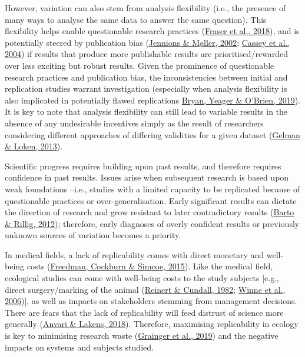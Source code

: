\documentclass[10pt,a4paper]{article}
\begin{document}
However, variation can also stem from analysis flexibility (i.e., the presence of many ways to analyse the same data to answer the same question).
This flexibility helps enable questionable research practices (\protect\hyperlink{ref-fraser_questionable_2018}{Fraser et al., 2018}), and is potentially steered by publication bias (\protect\hyperlink{ref-jennions_publication_2002}{Jennions \& Møller, 2002}; \protect\hyperlink{ref-cassey_survey_2004}{Cassey et al., 2004}) if results that produce more publishable results are prioritised/rewarded over less exciting but robust results.
Given the prominence of questionable research practices and publication bias, the inconsistencies between initial and replication studies warrant investigation (especially when analysis flexibility is also implicated in potentially flawed replications \protect\hyperlink{ref-bryan_replicator_2019}{Bryan, Yeager \& O'Brien, 2019}).
It is key to note that analysis flexibility can still lead to variable results in the absence of any undesirable incentives simply as the result of researchers considering different approaches of differing validities for a given dataset (\protect\hyperlink{ref-gelman_garden_2013}{Gelman \& Loken, 2013}).

Scientific progress requires building upon past results, and therefore requires confidence in past results.
Issues arise when subsequent research is based upon weak foundations --i.e., studies with a limited capacity to be replicated because of questionable practices or over-generalisation.
Early significant results can dictate the direction of research and grow resistant to later contradictory results (\protect\hyperlink{ref-barto_dissemination_2012}{Barto \& Rillig, 2012}); therefore, early diagnoses of overly confident results or previously unknown sources of variation becomes a priority.

In medical fields, a lack of replicability comes with direct monetary and well-being costs (\protect\hyperlink{ref-freedman_economics_2015}{Freedman, Cockburn \& Simcoe, 2015}).
Like the medical field, ecological studies can come with well-being costs to the study subjects {[}e.g., direct surgery/marking of the animal (\protect\hyperlink{ref-Reinert1982}{Reinert \& Cundall, 1982}; \protect\hyperlink{ref-Winne2006}{Winne et al., 2006}){]}, as well as impacts on stakeholders stemming from management decisions.
There are fears that the lack of replicability will feed distrust of science more generally (\protect\hyperlink{ref-anvari_replicability_2018}{Anvari \& Lakens, 2018}).
Therefore, maximising replicability in ecology is key to minimising research waste (\protect\hyperlink{ref-grainger_evidence_2019}{Grainger et al., 2019}) and the negative impacts on systems and subjects studied.
\end{document}
